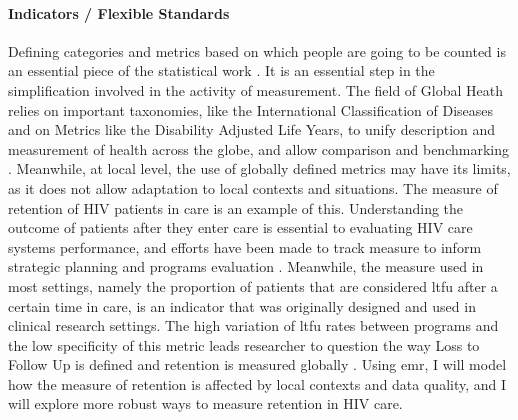 \paragraph{Indicators / Flexible Standards} Defining categories and metrics based on which people are going to be counted is an essential piece of the statistical work \citep{desrosieres_politique_1993}. It is an essential step in the simplification involved in the activity of measurement. The field of Global Heath relies on important taxonomies, like the International Classification of Diseases and on Metrics like the Disability Adjusted Life Years, to unify description and measurement of health across the globe, and allow comparison and benchmarking \citep{murray_towards_2007,murray_health_2008}. Meanwhile, at local level, the use of globally defined metrics may have its limits, as it does not allow adaptation to local contexts and situations. The measure of retention of HIV patients in care is an example of this. Understanding the outcome of patients after they enter care is essential to evaluating HIV care systems performance, and efforts have been made to track measure to inform strategic planning and programs evaluation   \citep{the_global_fund_global_2014}. Meanwhile, the measure used in most settings, namely the proportion of patients that are considered \gls{ltfu} after a certain time in care, is an indicator that was originally designed and used in clinical research settings. The high variation of  \gls{ltfu} rates between programs and the low specificity of this metric leads researcher to question the way Loss to Follow Up is defined and retention is measured globally \citep{chi_universal_2011,yehia_comparing_2012,grimsrud_impact_2013,forster_electronic_2008}. Using \gls{emr}, I will model how the measure of retention is affected by local contexts and data quality, and I will explore  more robust ways to measure retention in HIV care.

